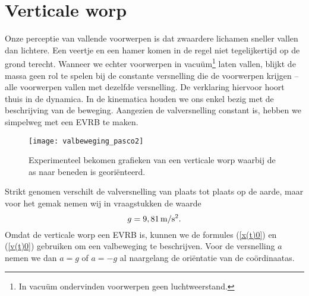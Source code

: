 \documentclass{ximera}
\begin{document}
	\author{Bart Lambregs}


	\section{Verticale worp}

	Onze perceptie van vallende voorwerpen is dat zwaardere lichamen sneller vallen dan lichtere. Een veertje en een hamer komen in de regel niet tegelij\-ker\-tijd op de grond terecht. Wanneer we echter voorwerpen in vacu\"um\footnote{In vacu\"um ondervinden voorwerpen geen luchtweerstand.} laten vallen, blijkt de massa geen rol te spelen bij de constante versnelling die de voorwerpen krijgen -- alle voorwerpen vallen met dezelfde versnelling. De verklaring hiervoor hoort thuis in de dynamica. In de kinematica houden we ons enkel bezig met de beschrijving van de beweging. Aangezien de valversnelling constant is, hebben we simpelweg met een EVRB te maken.
	\begin{figure}[h]
	\centering
	\texttt{[image: valbeweging\_pasco2]}
	\caption{Experimenteel bekomen grafieken van een verticale worp waarbij de as naar beneden is geori\"enteerd.}
	\end{figure}
	Strikt genomen verschilt de valversnelling van plaats tot plaats op de aarde, maar voor het gemak nemen wij in vraagstukken de waarde
	\[g=9,81\rm\,m/s^2.\]
	Omdat de verticale worp een EVRB is, kunnen we de formules (\ref{x(t)0}) en (\ref{v(t)0}) gebruiken om een valbeweging te beschrijven. Voor de versnelling $a$ nemen we dan $a=g$ of $a=-g$ al naargelang de ori\"entatie van de co\"ordinaatas.
	
	\clearpage
	\newpage
	
\end{document}
